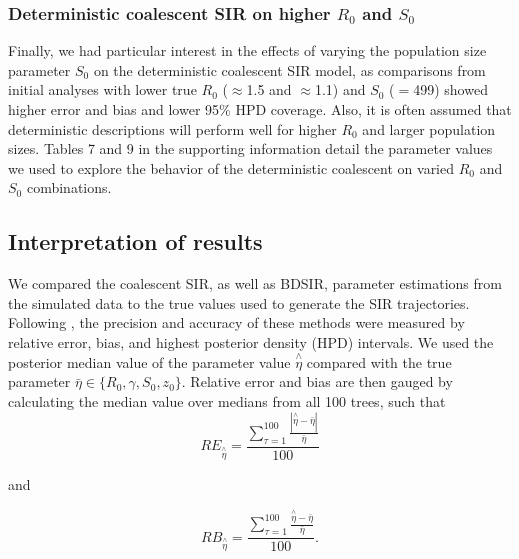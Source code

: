\documentclass[12pt,titlepage]{article}
\newcommand{\BDSIR}{BDSIR}
\begin{document}
\subsubsection{Deterministic coalescent SIR on higher $R_0$ and $S_0$}  
Finally, we had particular interest in the effects of varying the population size parameter $S_0$ on the deterministic coalescent SIR model, as comparisons from initial analyses with lower true $R_0$ ($\approx$1.5 and $\approx$1.1) and $S_0$ ($=$499) showed higher error and bias and lower 95\% HPD coverage. 
Also, it is often assumed that deterministic descriptions will perform well for higher $R_0$ and larger population sizes.  
Tables 7 and 9 in the supporting information detail the parameter values we used to explore the behavior of the deterministic coalescent on varied $R_0$ and $S_0$ combinations.


\subsection{Interpretation of results}

We compared the coalescent SIR, as well as \BDSIR{}, parameter estimations from the simulated data to the true values 
used to generate the SIR trajectories.
Following \cite{Kuhnert:2014}, the precision and accuracy of these methods were measured by 
relative error, bias, and highest posterior density (HPD) intervals.  We used the posterior 
median value of the parameter value $\overset{\wedge}{\eta}$ compared with the true parameter 
$\bar{\eta} \in\{R_{0}, \gamma, S_{0}, z_{0}\}$.  Relative error and bias are then gauged by calculating the 
median value over medians from all 100 trees, such that
$$RE_{\overset{\wedge}{\eta}} = \frac{\sum\nolimits_{\tau = 1}^{100}\frac{|\overset{\wedge}{\eta} - 
\bar{\eta}|}{\bar{\eta}}}{100} $$

\begin{center}
and
\end{center}
$$RB_{\overset{\wedge}{\eta}} = \frac{\sum\nolimits_{\tau = 1}^{100}\frac{\overset{\wedge}{\eta} - 
\bar{\eta}}{\bar{\eta}}}{100} . $$
\end{document}
